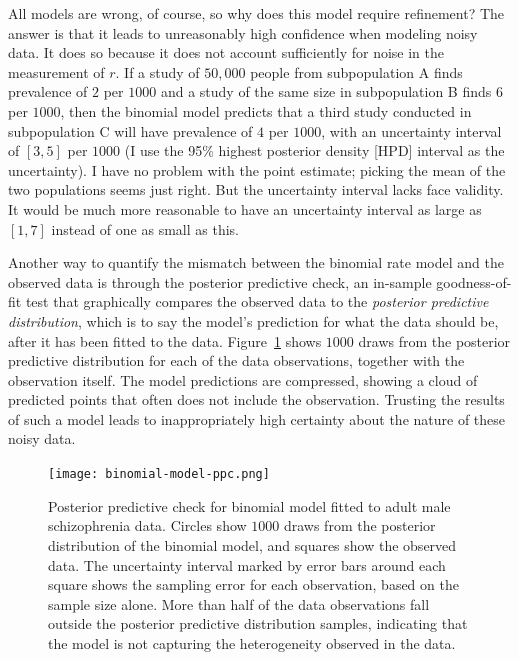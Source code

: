 All models are wrong, of course, so why does this model require
refinement? The answer is that it leads to unreasonably high
confidence when modeling noisy data.  It does so because it does not
account sufficiently for noise in the measurement of $r$. If a study
of $50,000$ people from subpopulation A finds prevalence of $2$ per
$1000$ and a study of the same size in subpopulation B finds $6$ per
$1000$, then the binomial model predicts that a third study conducted
in subpopulation C will have prevalence of $4$ per $1000$, with an
uncertainty interval of $[3,5]$ per $1000$ (I use the 95\% highest
posterior density [HPD] interval as the uncertainty).  I have no
problem with the point estimate; picking the mean of the two
populations seems just right.  But the uncertainty interval lacks face
validity.  It would be much more reasonable to have an uncertainty
interval as large as $[1,7]$ instead of one as small as this.

Another way to quantify the mismatch between the binomial rate model
and the observed data is through the posterior predictive check, an
in-sample goodness-of-fit test that graphically compares the observed
data to the \emph{posterior predictive distribution}, which is to say
the model's prediction for what the data should be, after it has been
fitted to the data.\cite{gelman_bayesian_2003}
Figure~\ref{rate-model-binom-ppc} shows $1000$ draws from the
posterior predictive distribution for each of the data observations,
together with the observation itself.  The model predictions are
compressed, showing a cloud of predicted points that often does not
include the observation.  Trusting the results of such a model leads
to inappropriately high certainty about the nature of these noisy data.

\begin{figure}[ht]
\begin{center}
\texttt{[image: binomial-model-ppc.png]}
\caption[Posterior predictive check for binomial model fitted to adult
  male schizophrenia data.]{Posterior predictive check for binomial model
  fitted to adult
  male schizophrenia data.  Circles show $1000$ draws from
  the posterior distribution of the binomial model, and squares
  show the observed data.  The uncertainty interval marked by error
  bars around each square shows the sampling error for each
  observation, based on the sample size alone. More than half of the
  data observations fall outside the posterior predictive distribution
  samples, indicating that the model is not capturing the
  heterogeneity observed in the data.}
\label{rate-model-binom-ppc}
\end{center}
\end{figure}


